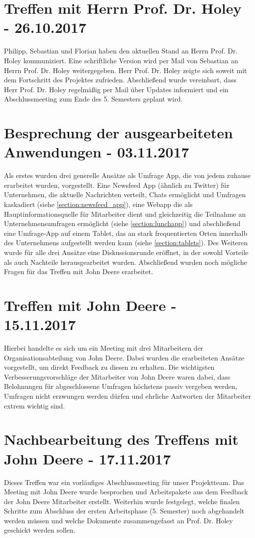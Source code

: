 \section{Treffen mit Herrn Prof. Dr. Holey - 26.10.2017}
Philipp, Sebastian und Florian haben den aktuellen Stand an Herrn Prof. Dr. Holey kommuniziert. Eine schriftliche Version wird per Mail von Sebastian an Herrn Prof. Dr. Holey weitergegeben. Herr Prof. Dr. Holey zeigte sich soweit mit dem Fortschritt des Projektes zufrieden. Abschließend wurde vereinbart, dass Herr Prof. Dr. Holey regelmäßig per Mail über Updates informiert und ein Abschlussmeeting zum Ende des 5. Semesters geplant wird.

\section{Besprechung der ausgearbeiteten Anwendungen - 03.11.2017}
Als erstes wurden drei generelle Ansätze als Umfrage App, die von jedem zuhause erarbeitet wurden, vorgestellt. Eine Newsfeed App (ähnlich zu Twitter) für Unternehmen, die aktuelle Nachrichten verteilt, Chats ermöglicht und Umfragen kaskadiert (siehe \vref{section:newsfeed_app}), eine Webapp die als Hauptinformationsquelle für Mitarbeiter dient und gleichzeitig die Teilnahme an Unternehmensumfragen ermöglicht (siehe \vref{section:lunchapp}) und abschließend eine Umfrage-App auf einem Tablet, das an stark frequentierten Orten innerhalb des Unternehmens aufgestellt werden kann (siehe \vref{section:tablets}). Des Weiteren wurde für alle drei Ansätze eine Diskussionsrunde eröffnet, in der sowohl Vorteile als auch Nachteile herausgearbeitet wurden. Abschließend wurden noch mögliche Fragen für das Treffen mit John Deere erarbeitet.

\section{Treffen mit John Deere - 15.11.2017}
Hierbei handelte es sich um ein Meeting mit drei Mitarbeitern der Organisationsabteilung von John Deere. Dabei wurden die erarbeiteten Ansätze vorgestellt, um direkt Feedback zu diesen zu erhalten. Die wichtigsten Verbesserungsvorschläge der Mitarbeiter von John Deere waren dabei, dass Belohnungen für abgeschlossene Umfragen höchstens passiv vergeben werden, Umfragen nicht erzwungen werden dürfen und ehrliche Antworten der Mitarbeiter extrem wichtig sind.

\section{Nachbearbeitung des Treffens mit John Deere - 17.11.2017}
Dieses Treffen war ein vorläufiges Abschlussmeeting für unser Projektteam. Das Meeting mit John Deere wurde besprochen und Arbeitspakete aus dem Feedback der John Deere Mitarbeiter erstellt. Weiterhin wurde festgelegt, welche finalen Schritte zum Abschluss der ersten Arbeitsphase (5. Semester) noch abgehandelt werden müssen und welche Dokumente zusammengefasst an Prof. Dr. Holey geschickt werden sollen.

